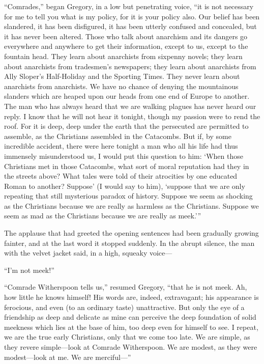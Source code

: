 “Comrades,” began Gregory, in a low but penetrating voice, “it is not necessary for me to tell you what is my policy, for it is your policy also. Our belief has been slandered, it has been disfigured, it has been utterly confused and concealed, but it has never been altered. Those who talk about anarchism and its dangers go everywhere and anywhere to get their information, except to us, except to the fountain head. They learn about anarchists from sixpenny novels; they learn about anarchists from tradesmen’s newspapers; they learn about anarchists from Ally Sloper’s Half-Holiday and the Sporting Times. They never learn about anarchists from anarchists. We have no chance of denying the mountainous slanders which are heaped upon our heads from one end of Europe to another. The man who has always heard that we are walking plagues has never heard our reply. I know that he will not hear it tonight, though my passion were to rend the roof. For it is deep, deep under the earth that the persecuted are permitted to assemble, as the Christians assembled in the Catacombs. But if, by some incredible accident, there were here tonight a man who all his life had thus immensely misunderstood us, I would put this question to him: ‘When those Christians met in those Catacombs, what sort of moral reputation had they in the streets above? What tales were told of their atrocities by one educated Roman to another? Suppose’ (I would say to him), ‘suppose that we are only repeating that still mysterious paradox of history. Suppose we seem as shocking as the Christians because we are really as harmless as the Christians. Suppose we seem as mad as the Christians because we are really as meek.’ ”

The applause that had greeted the opening sentences had been gradually growing fainter, and at the last word it stopped suddenly. In the abrupt silence, the man with the velvet jacket said, in a high, squeaky voice⁠—

“I’m not meek!”

“Comrade Witherspoon tells us,” resumed Gregory, “that he is not meek. Ah, how little he knows himself! His words are, indeed, extravagant; his appearance is ferocious, and even (to an ordinary taste) unattractive. But only the eye of a friendship as deep and delicate as mine can perceive the deep foundation of solid meekness which lies at the base of him, too deep even for himself to see. I repeat, we are the true early Christians, only that we come too late. We are simple, as they revere simple⁠—look at Comrade Witherspoon. We are modest, as they were modest⁠—look at me. We are merciful⁠—”

